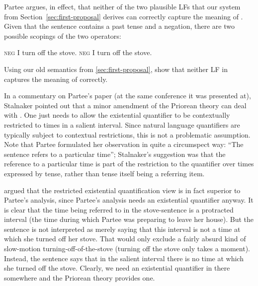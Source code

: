 Partee argues, in effect, that neither of the two plausible LFs that our system
from Section~\ref{sec:first-proposal} derives can correctly capture the meaning
of \Last. Given that the sentence contains a past tense and a negation, there
are two possible scopings of the two operators:

\pex
\a \past \textsc{neg} I turn off the stove.
\a \textsc{neg} \past I turn off the stove.
\xe

\begin{exercise}
  Using our old semantics from \ref{sec:first-proposal}, show that neither LF in
  \Last captures the meaning of \LLast correctly.
\end{exercise}

In a commentary on Partee’s paper (at the same conference it was presented at),
Stalnaker pointed out that a minor amendment of the Priorean theory can deal
with \LLast. One just needs to allow the existential quantifier to be
contextually restricted to times in a salient interval. Since natural language
quantifiers are typically subject to contextual restrictions, this is not a
problematic assumption. Note that Partee formulated her observation in quite a
circumspect way: ``The sentence refers to a particular time''; Stalnaker’s
suggestion was that the reference to a particular time is part of the
restriction to the quantifier over times expressed by tense, rather than tense
itself being a referring item.

\cite{ogihara-1995-tense-embedded, ogihara-1996-tense-book} argued that the
restricted existential quantification view is in fact superior to Partee’s
analysis, since Partee’s analysis needs an existential quantifier anyway. It is
clear that the time being referred to in the stove-sentence \LLast is a
protracted interval (the time during which Partee was preparing to leave her
house). But the sentence is not interpreted as merely saying that this interval
is not a time at which she turned off her stove. That would only exclude a
fairly absurd kind of slow-motion turning-off-of-the-stove (turning off the
stove only takes a moment). Instead, the sentence says that in the salient
interval there is no time at which she turned off the stove. %
%
Clearly, we need an existential quantifier in there somewhere and the Priorean
theory provides one.

